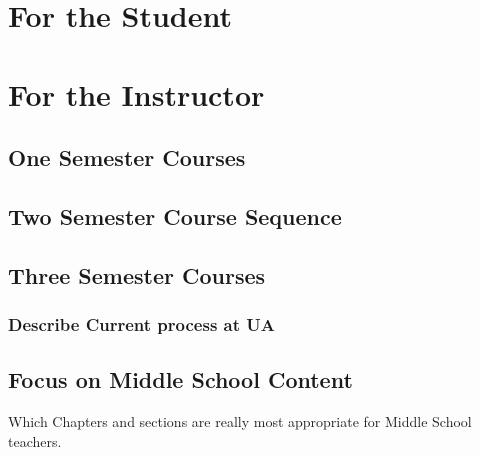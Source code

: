 \documentclass[
]{book}
\theoremstyle{definition}
\theoremstyle{definition}
\theoremstyle{definition}
\theoremstyle{definition}
\theoremstyle{remark}
\begin{document}
\hypertarget{for-the-student}{%
\section*{For the Student}\label{for-the-student}}

\hypertarget{for-the-instructor}{%
\section*{For the Instructor}\label{for-the-instructor}}

\hypertarget{one-semester-courses}{%
\subsection*{One Semester Courses}\label{one-semester-courses}}

\hypertarget{two-semester-course-sequence}{%
\subsection*{Two Semester Course Sequence}\label{two-semester-course-sequence}}

\hypertarget{three-semester-courses}{%
\subsection*{Three Semester Courses}\label{three-semester-courses}}

\hypertarget{describe-current-process-at-ua}{%
\subsubsection*{Describe Current process at UA}\label{describe-current-process-at-ua}}

\hypertarget{focus-on-middle-school-content}{%
\subsection*{Focus on Middle School Content}\label{focus-on-middle-school-content}}

Which Chapters and sections are really most appropriate for Middle School teachers.
\end{document}
